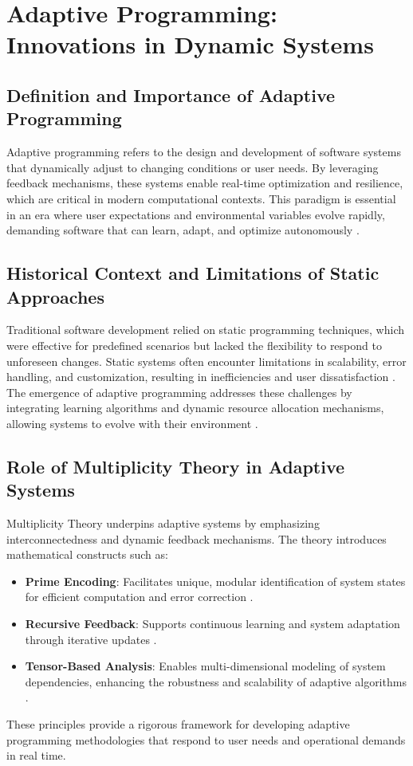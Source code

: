 \documentclass{article}
\theoremstyle{plain}
\begin{document}
\section{Adaptive Programming: Innovations in Dynamic Systems}

\subsection{Definition and Importance of Adaptive Programming}
Adaptive programming refers to the design and development of software systems that dynamically adjust to changing conditions or user needs. By leveraging feedback mechanisms, these systems enable real-time optimization and resilience, which are critical in modern computational contexts. This paradigm is essential in an era where user expectations and environmental variables evolve rapidly, demanding software that can learn, adapt, and optimize autonomously \cite{mitchell2009complexity}.

\subsection{Historical Context and Limitations of Static Approaches}
Traditional software development relied on static programming techniques, which were effective for predefined scenarios but lacked the flexibility to respond to unforeseen changes. Static systems often encounter limitations in scalability, error handling, and customization, resulting in inefficiencies and user dissatisfaction \cite{lewis2019software}. The emergence of adaptive programming addresses these challenges by integrating learning algorithms and dynamic resource allocation mechanisms, allowing systems to evolve with their environment \cite{parisi2019continual}.

\subsection{Role of Multiplicity Theory in Adaptive Systems}
Multiplicity Theory underpins adaptive systems by emphasizing interconnectedness and dynamic feedback mechanisms. The theory introduces mathematical constructs such as:
\begin{itemize}
    \item \textbf{Prime Encoding}: Facilitates unique, modular identification of system states for efficient computation and error correction \cite{knuth1997art}.
    \item \textbf{Recursive Feedback}: Supports continuous learning and system adaptation through iterative updates \cite{goodfellow2016deep}.
    \item \textbf{Tensor-Based Analysis}: Enables multi-dimensional modeling of system dependencies, enhancing the robustness and scalability of adaptive algorithms \cite{kolda2009tensor}.
\end{itemize}
These principles provide a rigorous framework for developing adaptive programming methodologies that respond to user needs and operational demands in real time.
\end{document}
